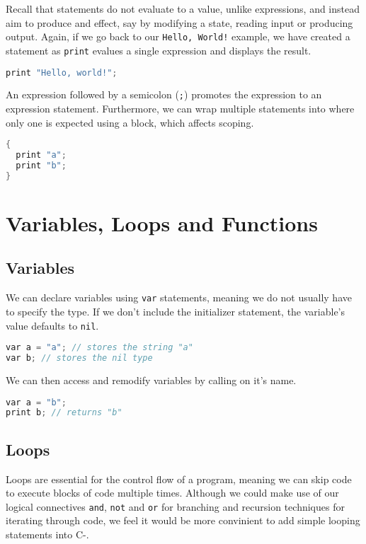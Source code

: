 Recall that statements do not evaluate to a value, unlike expressions, and instead aim to produce and effect, say by modifying a state, reading input or producing output. Again, if we go back to our \verb+Hello, World!+ example, we have created a statement as \verb+print+ evalues a single expression and displays the result. 

\begin{lstlisting}[language=C]
print "Hello, world!";
\end{lstlisting}

An expression followed by a semicolon (\verb+;+) promotes the expression to an expression statement. Furthermore, we can wrap multiple statements into where only one is expected using a block, which affects scoping. 

\begin{lstlisting}[language=C]
{
  print "a";
  print "b";
}
\end{lstlisting}

\section{Variables, Loops and Functions}

\subsection{Variables}

We can declare variables using \verb+var+ statements, meaning we do not usually have to specify the type. If we don't include the initializer statement, the variable’s value defaults to \verb+nil+.

\begin{lstlisting}[language=C]
var a = "a"; // stores the string "a"
var b; // stores the nil type
\end{lstlisting}

We can then access and remodify variables by calling on it's name.

\begin{lstlisting}[language=C]
var a = "b"; 
print b; // returns "b"
\end{lstlisting}

\subsection{Loops}

Loops are essential for the control flow of a program, meaning we can skip code to execute blocks of code multiple times. Although we could make use of our logical connectives \verb+and+, \verb+not+ and \verb+or+ for branching and recursion techniques for iterating through code, we feel it would be more convinient to add simple looping statements into C-. 

